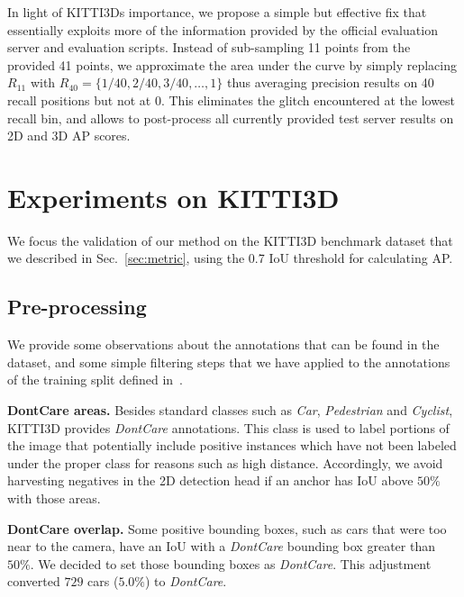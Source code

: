 \documentclass[10pt,twocolumn,letterpaper]{article}
\renewcommand{\paragraph}[1]{

        \vspace{3pt}
	\noindent\textbf{#1}}
\begin{document}
In light of KITTI3Ds importance, we propose a simple but effective fix that essentially exploits more of the information provided by the official evaluation server and evaluation scripts. Instead of sub-sampling 11 points from the provided 41 points, we approximate the area under the curve by simply replacing $R_{11}$ with $R_{40}=\{1/40, 2/40, 3/40, \ldots, 1\}$ thus averaging precision results on 40 recall positions but not at $0$. This eliminates the glitch encountered at the lowest recall bin, and allows to post-process all currently provided test server results on 2D and 3D AP scores.
\section{Experiments on KITTI3D}\label{sec:expKITTI}

We focus the validation of our method on the KITTI3D benchmark dataset that we described in Sec.~\ref{sec:metric}, using the 0.7 IoU threshold for calculating AP.


\subsection{Pre-processing}\label{ss:pre-processing}

We provide some observations about the annotations that can be found in the dataset, and some simple filtering steps that we have applied to the annotations of the training split defined in~\cite{NIPS2015_Chen}.

\paragraph{DontCare areas.} Besides standard classes such as \textit{Car}, \textit{Pedestrian} and \textit{Cyclist}, KITTI3D provides  \textit{DontCare} annotations. This class is used to label portions of the image that potentially include positive instances which have not been labeled under the proper class for reasons such as high distance. Accordingly, we avoid harvesting negatives in the 2D detection head if an anchor has IoU above $50\%$ with those areas. 

\paragraph{DontCare overlap.} Some positive bounding boxes, such as cars that were too near to the camera, have an IoU with a \textit{DontCare} bounding box greater than $50\%$. We decided to set those bounding boxes as \textit{DontCare}. This adjustment converted $729$ cars ($5.0\%$) to \textit{DontCare}.
\end{document}
